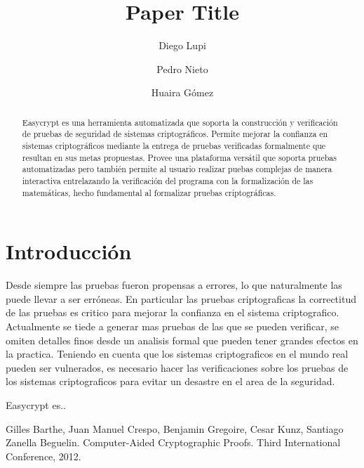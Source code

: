 \documentclass[runningheads]{llncs}
\begin{document}
\title{Paper Title}

\author{Diego Lupi\and Pedro Nieto\and Huaira Gómez}

%
%

\maketitle

\begin{abstract}
Easycrypt\cite{ref_article1} es una herramienta automatizada que soporta la construcción y verificación de pruebas de seguridad de sistemas criptográficos. Permite mejorar la confianza en sistemas criptográficos mediante la entrega de pruebas verificadas formalmente que resultan en sus metas propuestas. Provee una plataforma versátil que soporta pruebas automatizadas pero también permite al usuario realizar puebas complejas de manera interactiva entrelazando la verificación del programa con la formalización de las matemáticas, hecho fundamental al formalizar pruebas criptográficas.

\end{abstract}
%
%
%
\section{Introducción}
Desde siempre las pruebas fueron propensas a errores, lo que naturalmente las puede llevar a ser erróneas. En particular las pruebas criptograficas la correctitud de las pruebas es critico para mejorar la confianza en el sistema criptografico. Actualmente se tiede a generar mas pruebas de las que se pueden verificar, se omiten detalles finos desde un analisis formal que pueden tener grandes efectos en la practica. Teniendo en cuenta que los sistemas criptograficos en el mundo real pueden ser vulnerados, es necesario hacer las verificaciones sobre los pruebas de los sistemas criptograficos para evitar un desastre en el area de la seguridad.

Easycrypt es..

%
%
%
% 
% 
%
\begin{thebibliography}{8}
Gilles Barthe, Juan Manuel Crespo, Benjamin Gregoire, Cesar Kunz, Santiago Zanella Beguelin. Computer-Aided Cryptographic Proofs. Third International Conference, 2012.
\end{thebibliography}
\end{document}
